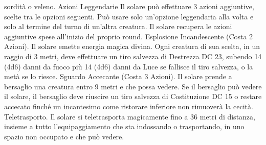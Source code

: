 \begin{multicols}{2}
sordità o veleno.
Azioni Leggendarie
Il solare può effettuare 3 azioni aggiuntive, scelte tra le opzioni
seguenti. Può usare solo un’opzione leggendaria alla volta e solo
al termine del turno di un’altra creatura. Il solare recupera le
azioni aggiuntive spese all’inizio del proprio round.
Esplosione Incandescente (Costa 2 Azioni). Il solare emette
energia magica divina. Ogni creatura di sua scelta, in un raggio di 3
metri, deve effettuare un tiro salvezza di Destrezza DC 23, subendo
14 (4d6) danni da fuoco più 14 (4d6) danni da Luce se fallisce il tiro
salvezza, o la metà se lo riesce.
Sguardo Accecante (Costa 3 Azioni). Il solare prende a
bersaglio una creatura entro 9 metri e che possa vedere. Se il
bersaglio può vedere il solare, il bersaglio deve riuscire un tiro
salvezza di Costituzione DC 15 o restare accecato finché un
incantesimo come ristorare inferiore non rimuoverà la cecità.
Teletrasporto. Il solare si teletrasporta magicamente fino a 36 metri
di distanza, insieme a tutto l’equipaggiamento che sta indossando o
trasportando, in uno spazio non occupato e che può vedere.
 

\end{multicols}
